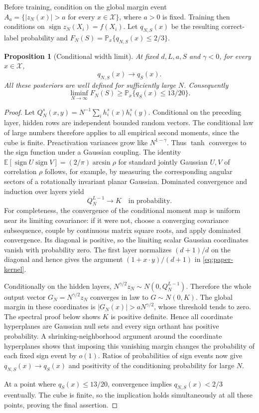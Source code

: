 \documentclass[11pt]{article}
\newtheorem{proposition}[theorem]{Proposition}
\theoremstyle{remark}\newtheorem{remark}[theorem]{Remark}
\DeclareMathOperator{\sign}{sign}
\begin{document}
Before training, condition on the global margin event
$A_a=\{|z_N(x)|>a\text{ for every }x\in\mathcal X\}$, where $a>0$
is fixed. Training then conditions on $\sign z_N(X_i)=f(X_i)$.
Let $q_{N,S}(x)$ be the resulting correct-label probability and
$F_N(S)=\mathbb P_x\{q_{N,S}(x)\le2/3\}$.

\begin{proposition}[Conditional width limit]\label{prop:paper-width}
At fixed $d,L,a,S$ and $\gamma<0$, for every $x\in\mathcal X$,
\[
 q_{N,S}(x)\longrightarrow q_S(x).
\]
All these posteriors are well defined for sufficiently large $N$.
Consequently
\[
 \liminf_{N\to\infty}F_N(S)\ge
 \mathbb P_x\{q_S(x)\le13/20\}.
\]
\end{proposition}
\begin{proof}
Let $Q_N^s(x,y)=N^{-1}\sum_i h_i^s(x)h_i^s(y)$. Conditional on
the preceding layer, hidden rows are independent bounded random vectors.
The conditional law of large numbers therefore applies to all empirical
second moments, since the cube is finite. Preactivation variances grow
like $N^{1-\gamma}$. Thus $\tanh$ converges to the sign function under
a Gaussian coupling. The identity
$\mathbb E[\sign U\sign V]=(2/\pi)\arcsin\rho$ for standard jointly
Gaussian $U,V$ of correlation $\rho$ follows, for example, by measuring
the corresponding angular sectors of a rotationally invariant planar
Gaussian. Dominated convergence and induction over layers yield
\[
 Q_N^{L-1}\longrightarrow K\quad\text{in probability}.
\]
For completeness, the convergence of the conditional moment map is
uniform near its limiting covariance: if it were not, choose a
converging covariance subsequence, couple by continuous matrix square
roots, and apply dominated convergence. Its diagonal is positive, so
the limiting scalar Gaussian coordinates vanish with probability zero.
The first layer normalizes $(d+1)/d$ on the diagonal and hence gives
the argument $(1+x\cdot y)/(d+1)$ in \eqref{eq:paper-kernel}.

Conditionally on the hidden layers,
$N^{\gamma/2}z_N\sim N(0,Q_N^{L-1})$. Therefore the whole output
vector $G_N=N^{\gamma/2}z_N$ converges in law to $G\sim N(0,K)$.
The global margin in these coordinates is
$|G_N(x)|>aN^{\gamma/2}$, whose threshold tends to zero. The spectral
proof below shows $K$ is positive definite. Hence all coordinate
hyperplanes are Gaussian null sets and every sign orthant has positive
probability. A shrinking-neighborhood argument around the coordinate
hyperplanes shows that imposing this vanishing margin changes the
probability of each fixed sign event by $o(1)$. Ratios of probabilities
of sign events now give $q_{N,S}(x)\to q_S(x)$ and positivity of the
conditioning probability for large $N$.

At a point where $q_S(x)\le13/20$, convergence implies
$q_{N,S}(x)<2/3$ eventually. The cube is finite, so the implication
holds simultaneously at all these points, proving the final assertion.
\end{proof}
\end{document}
